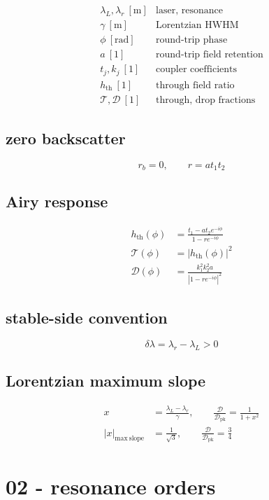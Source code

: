 \[
\begin{array}{ll}\lambda_L,\lambda_r\ [\mathrm m]&\text{laser, resonance}\\[0.6em]\gamma\ [\mathrm m]&\text{Lorentzian HWHM}\\[0.6em]\phi\ [\mathrm{rad}]&\text{round-trip phase}\\[0.6em]a\ [1]&\text{round-trip field retention}\\[0.6em]t_j,k_j\ [1]&\text{coupler coefficients}\\[0.6em]h_{\mathrm{th}}\ [1]&\text{through field ratio}\\[0.6em]\mathcal T,\mathcal D\ [1]&\text{through, drop fractions}\end{array}
\]

\subsection*{zero backscatter}
\[
\displaystyle r_b=0,\qquad r=a t_1t_2
\]

\subsection*{Airy response}
\[
\displaystyle \begin{aligned}h_{\mathrm{th}}(\phi)&=\frac{t_1-a t_2e^{-i\phi}}{1-r e^{-i\phi}}\\\mathcal T(\phi)&=|h_{\mathrm{th}}(\phi)|^2\\\mathcal D(\phi)&=\frac{k_1^2k_2^2a}{|1-r e^{-i\phi}|^2}\end{aligned}
\]

\subsection*{stable-side convention}
\[
\displaystyle \delta\lambda=\lambda_r-\lambda_L>0
\]

\subsection*{Lorentzian maximum slope}
\[
\displaystyle \begin{aligned}x&=\frac{\lambda_L-\lambda_r}{\gamma},\qquad\frac{\mathcal D}{\mathcal D_{\mathrm{pk}}}=\frac1{1+x^2}\\|x|_{\mathrm{max\ slope}}&=\frac1{\sqrt3},\qquad\frac{\mathcal D}{\mathcal D_{\mathrm{pk}}}=\frac34\end{aligned}
\]

\clearpage
\section*{02 - resonance orders}

